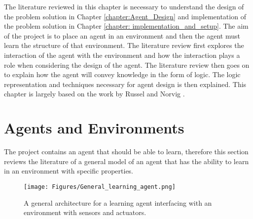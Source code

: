 The literature reviewed in this chapter is necessary to understand the design of the problem solution in Chapter \ref{chapter:Agent_Design} and implementation of the problem solution in Chapter \ref{chapter: implementation_and_setup}. The aim of the project is to place an agent in an environment and then the agent must learn the structure of that environment. The literature review first explores the interaction of the agent with the environment and how the interaction plays a role when considering the design of the agent. The literature review then goes on to explain how the agent will convey knowledge in the form of logic. The logic representation and techniques necessary for agent design is then explained. This chapter is largely based on the work by Russel and Norvig \citep{russell2016artificial}.




\section{Agents and Environments}
\label{sec:agents_and_environments}

The project contains an agent that should be able to learn, therefore this section reviews the literature of a general model of an agent that has the ability to learn in an environment with specific properties.

\begin{figure}[H]
    \centering
    \texttt{[image: Figures/General\_learning\_agent.png]}
    \caption{A general architecture for a learning agent interfacing with an environment with sensors and actuators.}
    \label{fig:agent_environment}
\end{figure}


